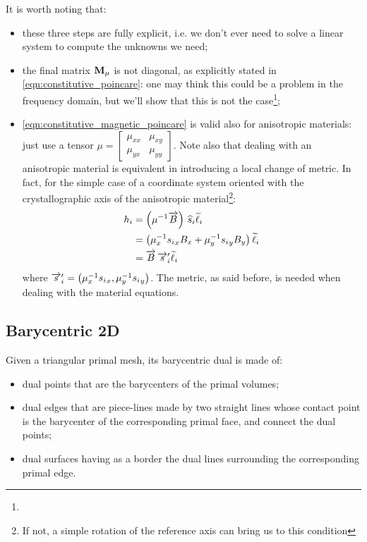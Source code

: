 It is worth noting that:
\begin{itemize}
\item
  these three steps are fully explicit, i.e. we
  don't ever need to solve a linear system to compute the unknowns we
  need;
\item
  the final matrix $\mathbf{M}_\mu$ is not diagonal, as
  explicitly stated in \eqref{eqn:constitutive_poincare}: one may
  think this could be a problem in the frequency domain, but we'll
  show that this is not the case\footnote{};
\item
  \eqref{eqn:constitutive_magnetic_poincare} is valid also for
  anisotropic materials: just use a tensor $\mu = \left[
  \begin{smallmatrix} \mu_{xx} & \mu_{xy} \\ \mu_{yx} & \mu_{yy}
  \end{smallmatrix} \right]$. Note also that dealing with an
  anisotropic material is equivalent in introducing a local change of
  metric. In fact, for the simple case of a coordinate system oriented
  with the crystallographic axis of the anisotropic
  material\footnote{If not, a simple rotation of the reference axis
  can bring us to this condition}:
  \begin{equation*} \begin{split}
    h_i & = {\left( \mu^{-1} \overrightarrow{B} \right)\,\widehat{s}_i} \widetilde{\ell}_i \\
        & = \left( \mu_x^{-1} {s_i}_x B_x + \mu_y^{-1} {s_i}_y B_y \right) \widetilde{\ell}_i \\
        & = {\overrightarrow{B}\,\overrightarrow{s}'_i} \widetilde{\ell}_i
  \end{split} \end{equation*}
  where $\overrightarrow{s}'_i = \left( \mu_x^{-1} {s_i}_x, \mu_y^{-1}
  {s_i}_y \right)$. The metric, as said before, is needed when dealing
  with the material equations.
\end{itemize}

\subsection{Barycentric 2D} \label{sec:barycentric}

Given a triangular primal mesh, its barycentric dual is made of:
\begin{itemize}
\item
  dual points that are the barycenters of the primal volumes;
\item
  dual edges that are piece-lines made by two straight lines whose
  contact point is the barycenter of the corresponding primal face,
  and connect the dual points;
\item
  dual surfaces having as a border the dual lines surrounding the
  corresponding primal edge.
\end{itemize}

